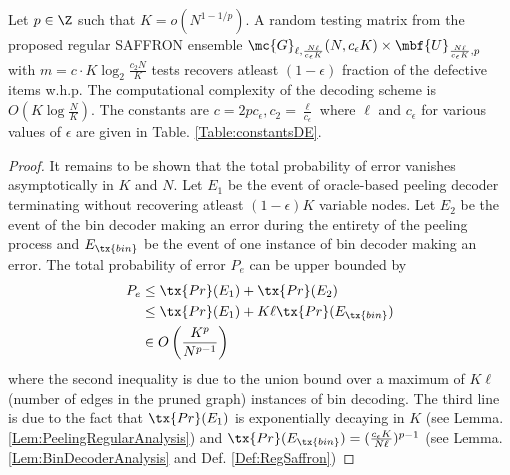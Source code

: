 \documentclass[conference,twocolumn]{IEEEtran}
\def\ceps{c_{\epsilon}}
\def\proofgap{-3ex}
\begin{document}
\begin{theorem}
\label{Thm:NoiselessMain}
Let $p\in\Z$ such that $K=o(N^{1-1/p})$. A random testing matrix from the proposed regular SAFFRON ensemble $\mc{G}_{\ell,\frac{N\ell}{\ceps K}}(N,\ceps K)\times \mbf{U}_{\frac{N\ell}{\ceps K},p}$ with $m=c\cdot K\log_{2}\frac{c_2 N}{K}$ tests recovers atleast $(1-\epsilon)$ fraction of the defective items w.h.p. The computational complexity of the decoding scheme is $O(K\log \frac{N}{K})$. The constants are $c=2p\ceps, c_2=\frac{\ell}{\ceps}$ where $\ell$ and $\ceps$ for various values of $\epsilon$ are given in Table. \ref{Table:constantsDE}.%
\end{theorem}
\vspace{\proofgap}
\begin{proof}
It remains to be shown that the total probability of error vanishes asymptotically in $K$ and $N$. Let $E_1$ be the event of oracle-based peeling decoder terminating without recovering atleast $(1-\epsilon)K$ variable nodes. Let $E_2$ be the event of the bin decoder making an error during the entirety of the peeling process and $E_{\tx{bin}}$ be the event of one instance of bin decoder making an error. The total probability of error $P_e$ can be upper bounded by
\begin{align*}
P_e &\leq \tx{Pr}(E_1)+ \tx{Pr}(E_2)\\
               &\leq \tx{Pr}(E_1)+ K\ell\tx{ Pr}(E_{\tx{bin}})\\
               &\in O\left(\frac{K^{p}}{N^{p-1}}\right)
\end{align*}
where the second inequality is due to the union bound over a maximum of $K\ell$ (number of edges in the pruned graph) instances of bin decoding. The third line is due to the fact that $\tx{Pr}(E_1)$ is exponentially decaying in $K$ (see Lemma. \ref{Lem:PeelingRegularAnalysis}) and $\tx{Pr}(E_{\tx{bin}})=(\frac{\ceps K}{N\ell})^{p-1}$ (see Lemma. \ref{Lem:BinDecoderAnalysis} and Def. \ref{Def:RegSaffron})
\end{proof}
\end{document}
